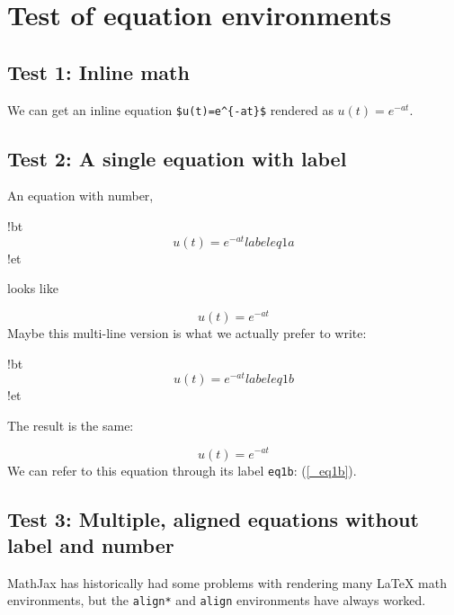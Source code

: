 \documentclass[%
oneside,                 %
final,                   %
10pt]{article}
\begin{document}
\section{Test of equation environments}

\subsection{Test 1: Inline math}

We can get an inline equation
\Verb!$u(t)=e^{-at}$! rendered as $u(t)=e^{-at}$.

\subsection{Test 2: A single equation with label}

An equation with number,





\blatexcod
!bt
\begin{equation} u(t)=e^{-at} label{eq1a}\end{equation}
!et

\elatexcod

looks like

\begin{equation} u(t)=e^{-at} \label{_eq1a}\end{equation}
Maybe this multi-line version is what we actually prefer to write:








\blatexcod
!bt
\begin{equation}
u(t)=e^{-at}
label{eq1b}
\end{equation}
!et

\elatexcod

The result is the same:

\begin{equation}
u(t)=e^{-at} \label{_eq1b}
\end{equation}
We can refer to this equation through its label \texttt{eq1b}: (\ref{_eq1b}).

\subsection{Test 3: Multiple, aligned equations without label and number}

MathJax has historically had some problems with rendering many {\LaTeX}
math environments, but the \texttt{align*} and \texttt{align} environments have
always worked.
\end{document}
